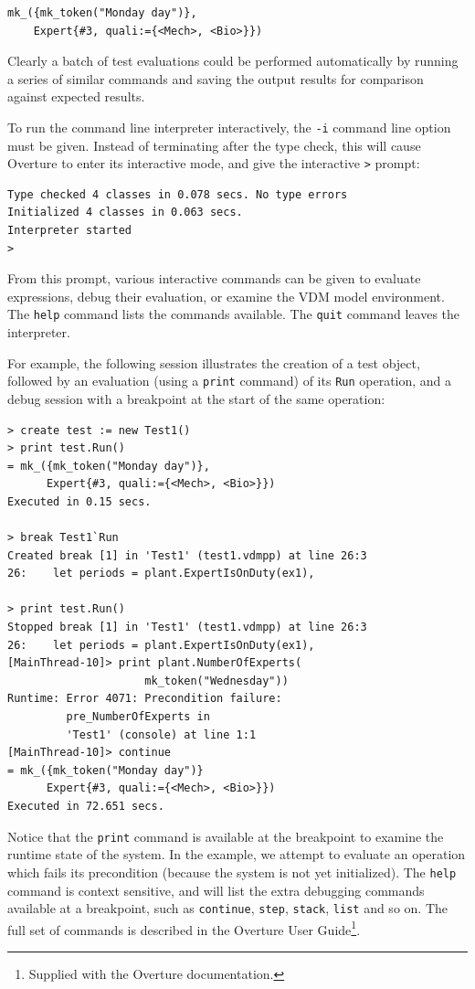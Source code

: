 \begin{lstlisting}
mk_({mk_token("Monday day")},
	Expert{#3, quali:={<Mech>, <Bio>}})
\end{lstlisting}

Clearly a batch of test evaluations could be performed automatically by running a series of similar commands and saving the output results for comparison against expected results.

To run the command line interpreter interactively, the \verb|-i| command line option must be given. Instead of terminating after the type check, this will cause Overture to enter its interactive mode, and give the interactive \verb|>|
prompt:

\begin{lstlisting}
Type checked 4 classes in 0.078 secs. No type errors
Initialized 4 classes in 0.063 secs.
Interpreter started
>
\end{lstlisting}

\noindent From this prompt, various interactive commands can be given to evaluate expressions, debug their evaluation, or examine the VDM model environment. The \verb|help| command lists the commands available. The \verb|quit| command leaves the interpreter.

For example, the following session illustrates the creation of a test object, followed by an evaluation (using a \texttt{print} command) of its \verb|Run| operation, and a debug
session with a breakpoint at the start of the same operation:

\begin{lstlisting}
> create test := new Test1()
> print test.Run()
= mk_({mk_token("Monday day")},
      Expert{#3, quali:={<Mech>, <Bio>}})
Executed in 0.15 secs.

> break Test1`Run
Created break [1] in 'Test1' (test1.vdmpp) at line 26:3
26:    let periods = plant.ExpertIsOnDuty(ex1),

> print test.Run()
Stopped break [1] in 'Test1' (test1.vdmpp) at line 26:3
26:    let periods = plant.ExpertIsOnDuty(ex1),
[MainThread-10]> print plant.NumberOfExperts(
                     mk_token("Wednesday"))
Runtime: Error 4071: Precondition failure:
         pre_NumberOfExperts in
         'Test1' (console) at line 1:1
[MainThread-10]> continue
= mk_({mk_token("Monday day")}
      Expert{#3, quali:={<Mech>, <Bio>}})
Executed in 72.651 secs.
\end{lstlisting}

\noindent Notice that the \verb|print| command is available at the breakpoint to examine the runtime state of the system. In the example, we attempt to evaluate an operation which fails its precondition (because the system is not yet initialized). The \verb|help| command is context sensitive, and will list the extra debugging commands available at a breakpoint, such as \verb|continue|, \verb|step|, \verb|stack|, \verb|list| and so on. The full set of commands is described in the Overture User Guide\footnote{Supplied with the Overture documentation.}.

